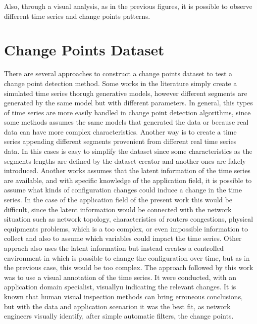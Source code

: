 Also, through a visual analysis, as in the previous figures, it is possible to observe different time series and change points patterns.


\section{Change Points Dataset}

There are several approaches to construct a change points dataset to test a change point detection method. Some works in the literature simply create a simulated time series thorugh generative models, however different segments are generated by the same model but with different parameters. In general, this types of time series are more easily handled in change point detection algorithms, since some methods assumes the same models that generated the data or because real data can have more complex characteristics. Another way is to create a time series appending different segments provenient from different real time series data. In this cases is easy to simplify the dataset since some characteristics as the segments lengths are defined by the dataset creator and another ones are fakely introduced. Another works assumes that the latent information of the time series are available, and with specific knowledge of the application field, it is possible to assume what kinds of configuration changes could induce a change in the time series. In the case of the application field of the present work this would be difficult, since the latent information would be connected with the network situation such as network topology, characteristics of routers congestions, physical equipments problems, which is a too complex, or even impossible information to collect and also to assume which variables could impact the time series. Other apprach also uses the latent information but instead creates a controlled environment in which is possible to change the configuration over time, but as in the previous case, this would be too complex. The approach followed by this work was to use a visual annotation of the time series. It were conducted, with an application domain specialist, visuallyu indicating the relevant changes. It is known that human visual inspection methods can bring erroneous conclusions, but with the data and application scenarion it was the best fit, as network engineers visually identify, after simple automatic filters, the change points.

